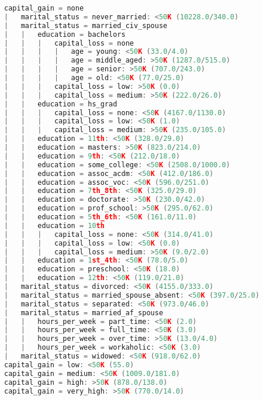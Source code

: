 \documentclass[a4paper]{llncs}
\begin{document}
\begin{lstlisting}[language=c,frame=single,breaklines=true,basicstyle=\footnotesize\ttfamily,caption={Decision tree built by C4.5 with -C 0.05},label=decision_tree_c45]
capital_gain = none
|   marital_status = never_married: <50K (10228.0/340.0)
|   marital_status = married_civ_spouse
|   |   education = bachelors
|   |   |   capital_loss = none
|   |   |   |   age = young: <50K (33.0/4.0)
|   |   |   |   age = middle_aged: >50K (1287.0/515.0)
|   |   |   |   age = senior: >50K (707.0/243.0)
|   |   |   |   age = old: <50K (77.0/25.0)
|   |   |   capital_loss = low: >50K (0.0)
|   |   |   capital_loss = medium: >50K (222.0/26.0)
|   |   education = hs_grad
|   |   |   capital_loss = none: <50K (4167.0/1130.0)
|   |   |   capital_loss = low: <50K (1.0)
|   |   |   capital_loss = medium: >50K (235.0/105.0)
|   |   education = 11th: <50K (328.0/29.0)
|   |   education = masters: >50K (823.0/214.0)
|   |   education = 9th: <50K (212.0/18.0)
|   |   education = some_college: <50K (2508.0/1000.0)
|   |   education = assoc_acdm: <50K (412.0/186.0)
|   |   education = assoc_voc: <50K (596.0/251.0)
|   |   education = 7th_8th: <50K (325.0/29.0)
|   |   education = doctorate: >50K (230.0/42.0)
|   |   education = prof_school: >50K (295.0/62.0)
|   |   education = 5th_6th: <50K (161.0/11.0)
|   |   education = 10th
|   |   |   capital_loss = none: <50K (314.0/41.0)
|   |   |   capital_loss = low: <50K (0.0)
|   |   |   capital_loss = medium: >50K (9.0/2.0)
|   |   education = 1st_4th: <50K (78.0/5.0)
|   |   education = preschool: <50K (18.0)
|   |   education = 12th: <50K (119.0/21.0)
|   marital_status = divorced: <50K (4155.0/333.0)
|   marital_status = married_spouse_absent: <50K (397.0/25.0)
|   marital_status = separated: <50K (973.0/46.0)
|   marital_status = married_af_spouse
|   |   hours_per_week = part_time: <50K (2.0)
|   |   hours_per_week = full_time: <50K (3.0)
|   |   hours_per_week = over_time: >50K (13.0/4.0)
|   |   hours_per_week = workaholic: <50K (3.0)
|   marital_status = widowed: <50K (918.0/62.0)
capital_gain = low: <50K (55.0)
capital_gain = medium: <50K (1009.0/181.0)
capital_gain = high: >50K (878.0/138.0)
capital_gain = very_high: >50K (770.0/14.0)
\end{lstlisting}

\clearpage
\end{document}
